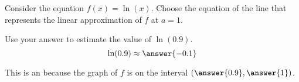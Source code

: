 \documentclass{ximera}
\author{Nela Lakos \and Kyle Parsons \and Bobby Ramsey}
\begin{document}
\begin{exercise}

Consider the equation $f(x) = \ln(x)$.  Choose the equation of the line that represents the linear approximation of $f$ at $a=1$.
\begin{multipleChoice}
\end{multipleChoice}

Use your answer to estimate the value of $\ln(0.9)$.
\[ \ln(0.9) \approx \answer{-0.1} \]

This is an
because the graph of $f$ is 
on the interval $\left( \answer{0.9}, \answer{1} \right)$.

\end{exercise}
\end{document}
